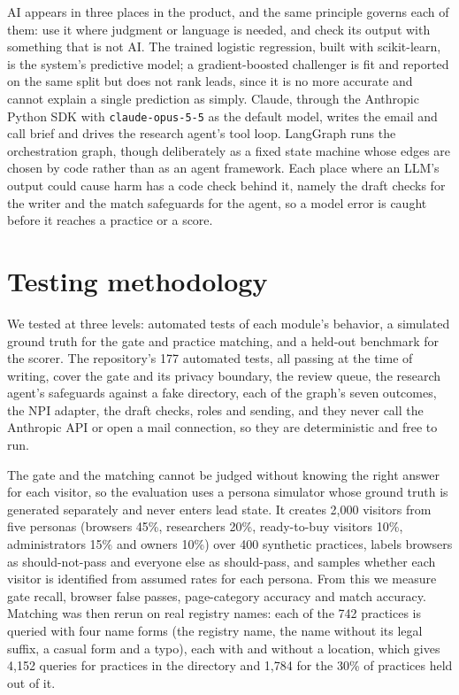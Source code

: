 \documentclass[11pt]{article}
\newcommand{\code}[1]{\texttt{\small #1}}
\begin{document}
AI appears in three places in the product, and the same principle governs each of them: use it where judgment or language is needed, and check its output with something that is not AI. The trained logistic regression, built with scikit-learn, is the system's predictive model; a gradient-boosted challenger is fit and reported on the same split but does not rank leads, since it is no more accurate and cannot explain a single prediction as simply. Claude, through the Anthropic Python SDK with \code{claude-opus-5-5} as the default model, writes the email and call brief and drives the research agent's tool loop. LangGraph runs the orchestration graph, though deliberately as a fixed state machine whose edges are chosen by code rather than as an agent framework. Each place where an LLM's output could cause harm has a code check behind it, namely the draft checks for the writer and the match safeguards for the agent, so a model error is caught before it reaches a practice or a score.

\section{Testing methodology}

We tested at three levels: automated tests of each module's behavior, a simulated ground truth for the gate and practice matching, and a held-out benchmark for the scorer. The repository's 177 automated tests, all passing at the time of writing, cover the gate and its privacy boundary, the review queue, the research agent's safeguards against a fake directory, each of the graph's seven outcomes, the NPI adapter, the draft checks, roles and sending, and they never call the Anthropic API or open a mail connection, so they are deterministic and free to run.

The gate and the matching cannot be judged without knowing the right answer for each visitor, so the evaluation uses a persona simulator whose ground truth is generated separately and never enters lead state. It creates 2,000 visitors from five personas (browsers 45\%, researchers 20\%, ready-to-buy visitors 10\%, administrators 15\% and owners 10\%) over 400 synthetic practices, labels browsers as should-not-pass and everyone else as should-pass, and samples whether each visitor is identified from assumed rates for each persona. From this we measure gate recall, browser false passes, page-category accuracy and match accuracy. Matching was then rerun on real registry names: each of the 742 practices is queried with four name forms (the registry name, the name without its legal suffix, a casual form and a typo), each with and without a location, which gives 4,152 queries for practices in the directory and 1,784 for the 30\% of practices held out of it.
\end{document}
